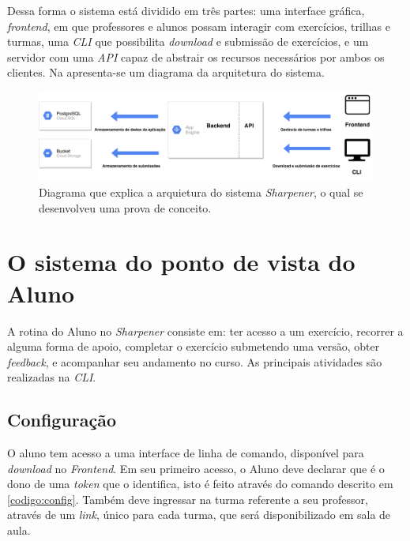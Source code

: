 Dessa forma o sistema está dividido em três partes: uma interface gráfica, \emph{frontend}, 
em que professores e alunos possam interagir com exercícios, trilhas e turmas, uma \emph{CLI} que possibilita 
\emph{download} e submissão de exercícios, e um servidor com uma \emph{API} capaz de abstrair 
os recursos necessários por ambos os clientes. Na  apresenta-se um diagrama 
da arquitetura do sistema.

  \begin{figure}[htpb]
    \centering
    \includegraphics[width=\linewidth]{images/arquitetura.pdf}
    \caption{Diagrama que explica a arquietura do sistema \emph{Sharpener}, o qual 
    se desenvolveu uma prova de conceito.}%
    \label{fig:arquitetura}
  \end{figure}


\section{O sistema do ponto de vista do Aluno}

A rotina do Aluno no \emph{Sharpener} consiste em: ter acesso a um exercício, recorrer a alguma forma de apoio, completar o exercício submetendo uma versão, obter \emph{feedback}, e acompanhar seu andamento no curso. As principais atividades são realizadas na \emph{CLI}.

\subsection{Configuração}
O aluno tem acesso a uma interface de linha de comando, 
disponível para \emph{download} no \emph{Frontend}. Em seu primeiro 
acesso, o Aluno deve declarar que é o dono de uma \emph{token} que o identifica, isto é feito através do comando descrito em \cref{codigo:config}. Também deve ingressar na turma referente a seu professor, através de um \emph{link}, único para cada turma,
que será disponibilizado em sala de aula.


